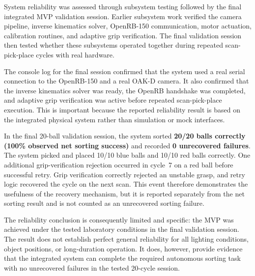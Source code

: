 
System reliability was assessed through subsystem testing followed
by the final integrated MVP validation session. Earlier subsystem
work verified the camera pipeline, inverse kinematics solver,
OpenRB-150 communication, motor actuation, calibration routines,
and adaptive grip verification. The final validation session then
tested whether these subsystems operated together during repeated
scan-pick-place cycles with real hardware.

The console log for the final session confirmed that the system
used a real serial connection to the OpenRB-150 and a real OAK-D
camera. It also confirmed that the inverse kinematics solver was
ready, the OpenRB handshake was completed, and adaptive grip
verification was active before repeated scan-pick-place execution.
This is important because the reported reliability result is based
on the integrated physical system rather than simulation or mock
interfaces.

In the final 20-ball validation session, the system sorted
\textbf{20/20 balls correctly (100\% observed net sorting
success)} and recorded \textbf{0 unrecovered failures}. The system
picked and placed 10/10 blue balls and 10/10 red balls correctly.
One additional grip-verification rejection occurred in cycle~7 on
a red ball before successful retry. Grip verification correctly
rejected an unstable grasp, and retry logic recovered the cycle on
the next scan. This event therefore demonstrates the usefulness of
the recovery mechanism, but it is reported separately from the net
sorting result and is not counted as an unrecovered sorting
failure.

The reliability conclusion is consequently limited and specific:
the MVP was achieved under the tested laboratory conditions in the
final validation session. The result does not establish perfect
general reliability for all lighting conditions, object positions,
or long-duration operation. It does, however, provide evidence
that the integrated system can complete the required autonomous
sorting task with no unrecovered failures in the tested 20-cycle
session.
